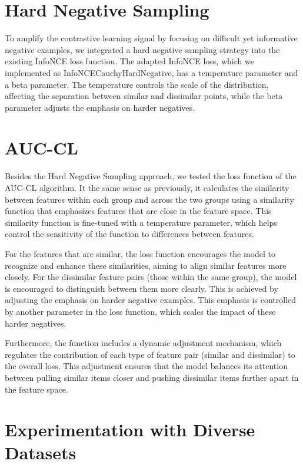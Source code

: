 \section{Hard Negative Sampling}
To amplify the contrastive learning signal by focusing on difficult yet informative negative examples, we integrated a hard negative sampling strategy into the existing InfoNCE loss function. The adapted InfoNCE loss, which we implemented as InfoNCECauchyHardNegative, has a temperature parameter and a beta parameter. The temperature controls the scale of the distribution, affecting the separation between similar and dissimilar points, while the beta parameter adjusts the emphasis on harder negatives.


\section{AUC-CL}

Besides the Hard Negative Sampling approach, we tested the loss function of the AUC-CL algorithm. It the same sense as previously, it calculates the similarity between features within each group and across the two groups using a similarity function that emphasizes features that are close in the feature space. This similarity function is fine-tuned with a temperature parameter, which helps control the sensitivity of the function to differences between features.

For the features that are similar, the loss function encourages the model to recognize and enhance these similarities, aiming to align similar features more closely. For the dissimilar feature pairs (those within the same group), the model is encouraged to distinguish between them more clearly. This is achieved by adjusting the emphasis on harder negative examples. This emphasis is controlled by another parameter in the loss function, which scales the impact of these harder negatives.

Furthermore, the function includes a dynamic adjustment mechanism, which regulates the contribution of each type of feature pair (similar and dissimilar) to the overall loss. This adjustment ensures that the model balances its attention between pulling similar items closer and pushing dissimilar items further apart in the feature space.

\section{Experimentation with Diverse Datasets}

